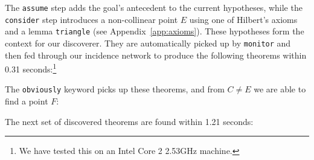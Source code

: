 \vspace{0.2cm}
\noindent{}
\vspace{0.1cm}

The \texttt{assume} step adds the goal's antecedent to the current hypotheses, while the \texttt{consider} step introduces a non-collinear point $E$ using one of Hilbert's axioms and a lemma \texttt{triangle} (see Appendix~\ref{app:axioms}). These hypotheses form the context for our discoverer. They are automatically picked up by \texttt{monitor} and then fed through our incidence network to produce the following theorems within 0.31 seconds:\footnote{We have tested this on an Intel Core 2 2.53GHz machine.}

\vspace{0.2cm}
\noindent{}
\vspace{0.1cm}

The \texttt{obviously} keyword picks up these theorems, and from $C\neq E$ we are able to find a point $F$:

\vspace{0.2cm}
\noindent{}
\vspace{0.1cm}

The next set of discovered theorems are found within 1.21 seconds:

